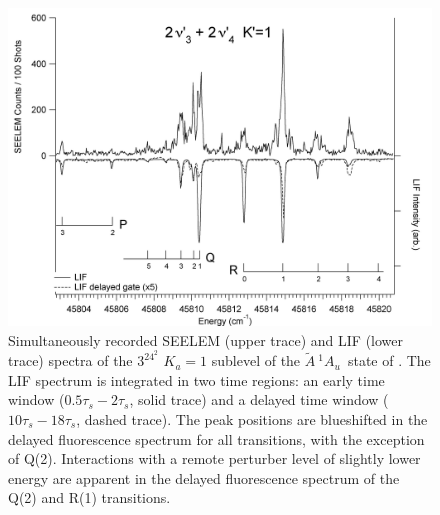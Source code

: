 \documentclass[12pt]{mitthesis}
\newcommand{\astate}{$
  \tilde{A} \: ^1\!A_u
  $}
\newcommand{\Ka}[1]{$K_a\!\!=\!#1$}
\begin{document}
\begin{figure}
  \caption{Simultaneously recorded SEELEM (upper trace) and LIF (lower
    trace) spectra of the $3^24^2$ \Ka{1} sublevel of the \astate\
    state of .  The LIF spectrum is integrated in two time
    regions: an early time window ($0.5\tau_s-2\tau_s$, solid trace)
    and a delayed time window ($10\tau_s-18\tau_s$, dashed trace).
    The peak positions are blueshifted in the delayed fluorescence
    spectrum for all transitions, with the exception of Q(2).
    Interactions with a remote perturber level of slightly lower
    energy are apparent in the delayed fluorescence spectrum of the
    Q(2) and R(1) transitions.}
  \label{fig:spectrum-32b2}
  \centering
  \includegraphics[width=7in,angle=90]{acetylene-32b2-p3r4.png}
\end{figure}
\end{document}
